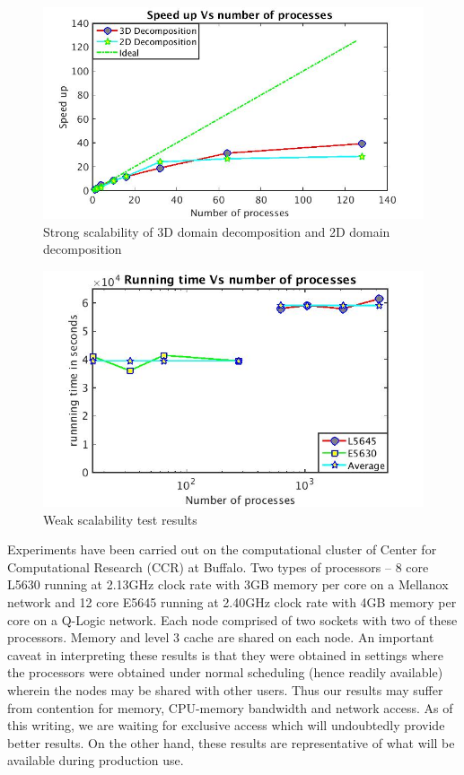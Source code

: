 \documentclass[conference,compsoc]{IEEEtran}
\begin{document}
%
\begin{figure}[!t]
\centering
\includegraphics[scale=0.33]{2D_vs_3D_efficiency}
\caption{Strong scalability of 3D domain decomposition and 2D domain decomposition}
\label{fig:2D_vs_3D_efficiency}
\end{figure}
%
\begin{figure}[!t]
\centering
\includegraphics[scale=0.35]{weak_loglog}
\caption{Weak scalability test results}
\label{fig:weak_loglog}
\end{figure}
Experiments have been carried out on the computational cluster of Center for Computational Research (CCR) at Buffalo. Two types of processors -- 8 core L5630 running at 2.13GHz clock rate with 3GB memory per core on a Mellanox network and 12 core E5645 running at 2.40GHz clock rate with 4GB memory per core on a Q-Logic network. Each node comprised of two sockets with two of these processors. Memory and level 3 cache are shared on each node.
An important caveat in interpreting these results is that they were obtained in settings where the processors were obtained under normal scheduling (hence readily available) wherein the nodes may be shared with other users. Thus our results may suffer from contention for memory, CPU-memory bandwidth and network access. As of this writing, we are waiting for exclusive access which will undoubtedly provide better results. On the other hand, these results are representative of what will be available during production use.
\end{document}
